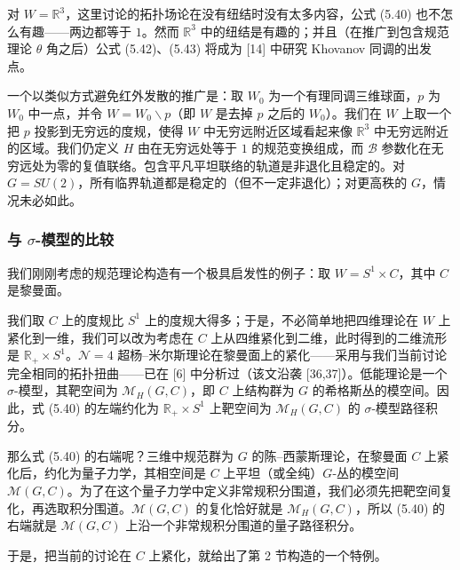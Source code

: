 \documentclass[11pt,a4paper,UTF8]{ctexart}
\theoremstyle{plain}
\theoremstyle{definition}
\newcommand{\sigmatxt}{$\sigma$}
\begin{document}
对 $W=\mathbb{R}^3$，这里讨论的拓扑场论在没有纽结时没有太多内容，公式 (5.40) 也不怎么有趣——两边都等于 $1$。然而 $\mathbb{R}^3$ 中的纽结是有趣的；并且（在推广到包含规范理论 $\theta$ 角之后）公式 (5.42)、(5.43) 将成为 [14] 中研究 Khovanov 同调的出发点。

一个以类似方式避免红外发散的推广是：取 $W_0$ 为一个有理同调三维球面，$p$ 为 $W_0$ 中一点，并令 $W=W_0\backslash p$（即 $W$ 是去掉 $p$ 之后的 $W_0$）。我们在 $W$ 上取一个把 $p$ 投影到无穷远的度规，使得 $W$ 中无穷远附近区域看起来像 $\mathbb{R}^3$ 中无穷远附近的区域。我们仍定义 $H$ 由在无穷远处等于 $1$ 的规范变换组成，而 $\mathcal{B}$ 参数化在无穷远处为零的复值联络。包含平凡平坦联络的轨道是非退化且稳定的。对 $G=SU(2)$，所有临界轨道都是稳定的（但不一定非退化）；对更高秩的 $G$，情况未必如此。


\subsubsection{与 \sigmatxt-模型的比较}

我们刚刚考虑的规范理论构造有一个极具启发性的例子：取 $W=S^1\times C$，其中 $C$ 是黎曼面。

我们取 $C$ 上的度规比 $S^1$ 上的度规大得多；于是，不必简单地把四维理论在 $W$ 上紧化到一维，我们可以改为考虑在 $C$ 上从四维紧化到二维，此时得到的二维流形是 $\mathbb{R}_+\times S^1$。$\mathcal{N}=4$ 超杨–米尔斯理论在黎曼面上的紧化——采用与我们当前讨论完全相同的拓扑扭曲——已在 [6] 中分析过（该文沿袭 [36,37]）。低能理论是一个 $\sigma$-模型，其靶空间为 $\mathcal{M}_H(G,C)$，即 $C$ 上结构群为 $G$ 的希格斯丛的模空间。因此，式 (5.40) 的左端约化为 $\mathbb{R}_+\times S^1$ 上靶空间为 $\mathcal{M}_H(G,C)$ 的 $\sigma$-模型路径积分。

那么式 (5.40) 的右端呢？三维中规范群为 $G$ 的陈–西蒙斯理论，在黎曼面 $C$ 上紧化后，约化为量子力学，其相空间是 $C$ 上平坦（或全纯）$G$-丛的模空间 $\mathcal{M}(G,C)$。为了在这个量子力学中定义非常规积分围道，我们必须先把靶空间复化，再选取积分围道。$\mathcal{M}(G,C)$ 的复化恰好就是 $\mathcal{M}_H(G,C)$，所以 (5.40) 的右端就是 $\mathcal{M}(G,C)$ 上沿一个非常规积分围道的量子路径积分。

于是，把当前的讨论在 $C$ 上紧化，就给出了第 2 节构造的一个特例。
\end{document}
